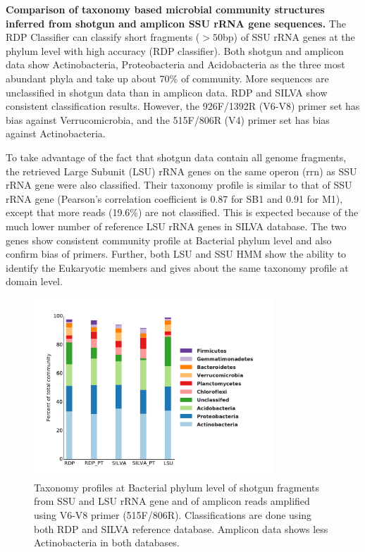 \documentclass[12pt]{article}
\begin{document}
  {\bf Comparison of taxonomy based microbial community structures inferred from shotgun and amplicon SSU rRNA gene sequences. }
The RDP Classifier can classify short fragments ($>50$bp) of SSU rRNA genes at the phylum level with high accuracy (RDP classifier). Both shotgun and amplicon data show Actinobacteria, Proteobacteria and Acidobacteria as the three most abundant phyla and take up about 70\% of community. More sequences are unclassified in shotgun data than in amplicon data. RDP and SILVA show consistent classification results. However, the 926F/1392R (V6-V8) primer set has bias against Verrucomicrobia, and the 515F/806R (V4) primer set has bias against Actinobacteria.

  To take advantage of the fact that shotgun data contain all genome fragments, the retrieved Large Subunit (LSU) rRNA genes on the same operon (rrn) as SSU rRNA gene were also classified. Their taxonomy profile is similar to that of SSU rRNA gene (Pearson’s correlation coefficient is 0.87 for SB1 and 0.91 for M1), except that more reads (19.6\%) are not classified. This is expected because of the much lower number of reference LSU rRNA genes in SILVA database. The two genes show consistent community profile at Bacterial phylum level and also confirm bias of primers. Further, both LSU and SSU HMM show the ability to identify the Eukaryotic members and gives about the same taxonomy profile at domain level.

\begin{figure}[tbph!]
  \centering
  \includegraphics[width=0.8\textwidth]{figs/V6to8_SB1_taxa}
  \caption[Taxonomy profiles at Bacterial phylum level of shotgun fragments and of amplicon reads amplified using V6-V8 primer]{Taxonomy profiles at Bacterial phylum level of shotgun fragments from SSU and LSU rRNA gene and of amplicon reads amplified using V6-V8 primer (515F/806R). Classifications are done using both RDP and SILVA reference database. Amplicon data shows less Actinobacteria in both databases.}
  \label{fig:V6to8_SB1_taxa}
\end{figure}
\end{document}
